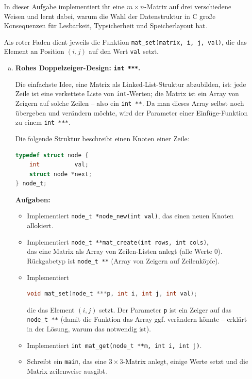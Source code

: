 In dieser Aufgabe implementiert ihr eine $m \times n$-Matrix auf drei verschiedene Weisen
und lernt dabei, warum die Wahl der Datenstruktur in C große Konsequenzen für Lesbarkeit,
Typsicherheit und Speicherlayout hat.

Als roter Faden dient jeweils die Funktion \texttt{mat\_set(matrix, i, j, val)},
die das Element an Position $(i, j)$ auf den Wert \texttt{val} setzt.

\begin{enumerate}[a)]

\item \textbf{Rohes Doppelzeiger-Design: \texttt{int ***}.}

Die einfachste Idee, eine Matrix als Linked-List-Struktur abzubilden, ist:
jede Zeile ist eine verkettete Liste von \texttt{int}-Werten;
die Matrix ist ein Array von Zeigern auf solche Zeilen -- also ein \texttt{int **}.
Da man dieses Array selbst noch übergeben und verändern möchte, wird der Parameter
einer Einfüge-Funktion zu einem \texttt{int ***}.

Die folgende Struktur beschreibt einen Knoten einer Zeile:

\begin{lstlisting}[language=C]
typedef struct node {
    int          val;
    struct node *next;
} node_t;
\end{lstlisting}

\textbf{Aufgaben:}
\begin{itemize}
  \item Implementiert \texttt{node\_t *node\_new(int val)}, das einen neuen Knoten allokiert.
  \item Implementiert \texttt{node\_t **mat\_create(int rows, int cols)},\\
        das eine Matrix als Array von Zeilen-Listen anlegt (alle Werte 0).
        Rückgabetyp ist \texttt{node\_t **} (Array von Zeigern auf Zeilenköpfe).
  \item Implementiert
\begin{lstlisting}[language=C]
void mat_set(node_t ***p, int i, int j, int val);
\end{lstlisting}
        die das Element $(i,j)$ setzt. Der Parameter \texttt{p} ist ein Zeiger auf das
        \texttt{node\_t **} (damit die Funktion das Array ggf. verändern könnte --
        erklärt in der Lösung, warum das notwendig ist).
  \item Implementiert \texttt{int mat\_get(node\_t **m, int i, int j)}.
  \item Schreibt ein \texttt{main}, das eine $3 \times 3$-Matrix anlegt, einige Werte
        setzt und die Matrix zeilenweise ausgibt.
\end{itemize}


\end{enumerate}

